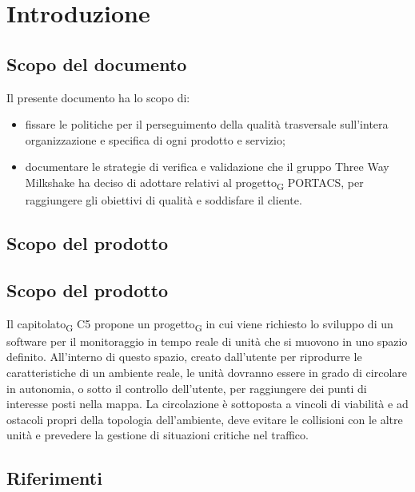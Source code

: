 \section{Introduzione}
\subsection{Scopo del documento}
    Il presente documento ha lo scopo di:
    \begin{itemize}
        \item fissare le politiche per il perseguimento della qualità trasversale sull'intera organizzazione e specifica di ogni prodotto e servizio;
        \item documentare le strategie di verifica e validazione che il gruppo Three Way Milkshake ha deciso di adottare relativi al \gls{progetto}\textsubscript{G} PORTACS, per raggiungere gli obiettivi di qualità e soddisfare il cliente.
    \end{itemize}


\subsection{Scopo del prodotto}
    \subsection{Scopo del prodotto}
    Il \gls{capitolato}\textsubscript{G} C5 propone un \gls{progetto}\textsubscript{G} in cui viene richiesto lo sviluppo di un software per il monitoraggio in tempo reale di unità che si muovono in uno spazio definito. All'interno di questo spazio, creato dall'utente per riprodurre le caratteristiche di un ambiente reale, le unità dovranno essere in grado di circolare in autonomia, o sotto il controllo dell'utente, per raggiungere dei punti di interesse posti nella mappa.  La circolazione è sottoposta a vincoli di viabilità e ad ostacoli propri della topologia dell'ambiente, deve evitare le collisioni con le altre unità e prevedere la gestione di situazioni critiche nel traffico.

\subsection{Riferimenti}
\label{ref}
